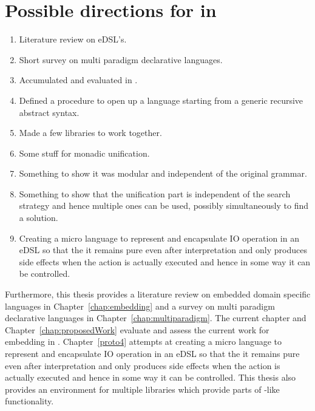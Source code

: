\documentclass[thesis-solanki.tex]{subfiles}
\begin{document}
\section{Possible directions for  in }\label{sec:work-in-points}
\begin{enumerate}
\item Literature review on eDSL's.

\item Short survey on multi paradigm declarative languages.

\item Accumulated and evaluated  in .

\item Defined a procedure to open up a language starting from a generic recursive abstract syntax.

\item Made a few libraries to work together.

\item Some stuff for monadic unification.

\item Something to show it was modular and independent of the original grammar.

\item
  Something to show that the unification part is independent of the search strategy and hence multiple ones can be
  used, possibly simultaneously to find a solution.

\item
  Creating a micro language to represent and encapsulate IO operation in an eDSL so that the it remains pure even
  after interpretation and only produces side effects when the action is actually executed and hence in some way it
  can be controlled.

\end{enumerate}

Furthermore, this thesis provides a literature review on embedded domain specific languages in Chapter~\ref{chap:embedding} and a survey on
multi paradigm declarative languages in Chapter~\ref{chap:multiparadigm}. The current chapter and Chapter~\ref{chap:proposedWork} evaluate 
and assess the current work for embedding  in . Chapter~\ref{proto4} attempts at creating a micro 
language to represent and encapsulate IO operation in an eDSL so that the it remains pure even after interpretation and only produces side 
effects when the action is actually executed and hence in some way it can be controlled. This thesis also provides an environment for 
multiple  libraries which provide parts of -like functionality. 
\end{document}
